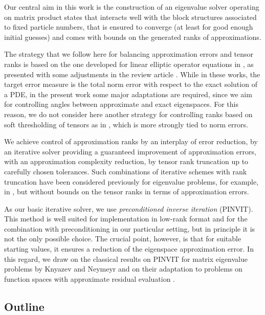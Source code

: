 \documentclass[a4paper,11pt,oneside]{amsart}
\theoremstyle{definition}
\theoremstyle{remark}
\numberwithin{equation}{section}
\numberwithin{theorem}{section}
\begin{document}
Our central aim in this work is the construction of an eigenvalue solver operating on matrix product states that interacts well with the block structures associated to fixed particle numbers, that is ensured to converge (at least for good enough initial guesses) and comes with bounds on the generated ranks of approximations.

The strategy that we follow here for balancing approximation errors and tensor ranks is based on the one developed for linear elliptic operator equations in \cite{BachmayrDahmen:15,BachmayrDahmen:16}, as presented with some adjustments in the review article \cite{B23}. 
While in these works, the target error measure is the total norm error with respect to the exact solution of a PDE, in the present work some major adaptations are required, since we aim for controlling angles between approximate and exact eigenspaces.
For this reason, we do not consider here another strategy for controlling ranks based on soft thresholding of tensors as in \cite{BachmayrSchneider:17}, which is more strongly tied to norm errors.

We achieve control of approximation ranks by an interplay of error reduction, by an iterative solver providing a guaranteed improvement of approximation errors, with an approximation complexity reduction, by tensor rank truncation up to carefully chosen tolerances. Such combinations of iterative schemes with rank truncation have been considered previously for eigenvalue problems, for example, in \cite{Kressner:11,Dolgov:14,KSU:14}, but without bounds on the tensor ranks in terms of approximation errors. 

As our basic iterative solver, we use \emph{preconditioned inverse iteration} (PINVIT). This method is well suited for implementation in low-rank format and for the combination with preconditioning in our particular setting, but in principle it is not the only possible choice. The crucial point, however, is that for suitable starting values, it ensures a reduction of the eigenspace approximation error.
In this regard, we draw on the classical results on PINVIT for matrix eigenvalue problems by Knyazev and Neymeyr \cite{KN:03,KN:09} and on their adaptation to problems on function spaces with approximate residual evaluation \cite{Rohwedder:11}. 

\subsection{Outline}
\end{document}
